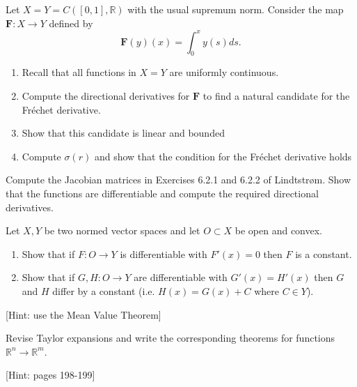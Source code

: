 \documentclass[11pt]{article}%
\newcommand{\R}{\mathbb{R}}
\begin{document}
\begin{Exercise}[title=**$\dagger$]
	Let $X=Y=C([0,1], \mathbb R)$ with the usual supremum norm. Consider the map $\textbf{F}:X\to Y$ defined by
	\[\textbf{F}(y)(x) = \int_0^x y(s)ds.\]
	\begin{enumerate}
		\item Recall that all functions in $X=Y$ are uniformly continuous.
		\item Compute the directional derivatives for $\textbf{F}$ to find a natural candidate for the Fréchet derivative.
		\item Show that this candidate is linear and bounded
		\item Compute $\sigma(r)$ and show that the condition for the Fréchet derivative holds
	\end{enumerate}
\end{Exercise}

\begin{Exercise}[title=*]
	Compute the Jacobian matrices in Exercises 6.2.1 and 6.2.2 of Lindtstrøm. Show that the functions are differentiable and compute the required directional derivatives.
\end{Exercise}

\begin{Exercise}[title=*]
	Let $X,Y$ be two normed vector spaces and let $O\subset X$ be open and convex.
	\begin{enumerate}
		\item Show that if $F:O\to Y$ is differentiable with $F'(x)=0$ then $F$ is a constant.
		\item Show that if $G,H:O\to Y$ are differentiable with $G'(x)=H'(x)$ then $G$ and $H$ differ by a constant (i.e. $H(x)=G(x)+C$ where $C\in Y$).
	\end{enumerate}
	[Hint: use the Mean Value Theorem]
\end{Exercise}

\begin{Exercise}[title=**]
	Revise Taylor expansions and write the corresponding theorems for functions $\R^n\to \R^m$.
	
	[Hint: pages 198-199]
\end{Exercise}
\end{document}
